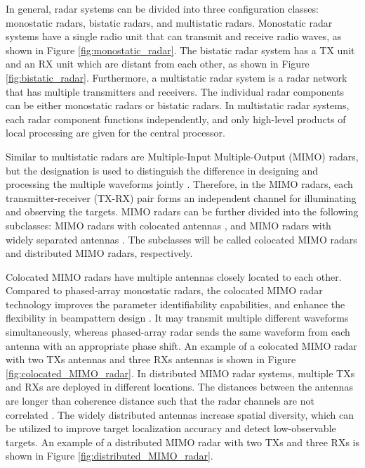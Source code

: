 \documentclass[english, 12pt, a4paper, elec, utf8, a-1b, online]{aaltothesis}
\numberwithin{equation}{section}
\begin{document}
In general, radar systems can be divided into three configuration classes: monostatic radars, bistatic radars, and multistatic radars.
Monostatic radar systems have a single radio unit that can transmit and receive radio waves, as shown in Figure \ref{fig:monostatic_radar}.
The bistatic radar system has a TX unit and an RX unit which are distant from each other, as shown in Figure \ref{fig:bistatic_radar}.
Furthermore, a multistatic radar system is a radar network that has multiple transmitters and receivers.
The individual radar components can be either monostatic radars or bistatic radars.
In multistatic radar systems, each radar component functions independently, and only high-level products of local processing are given for the central processor.

Similar to multistatic radars are Multiple-Input Multiple-Output (MIMO) radars, but the designation is used to distinguish the difference in designing and processing the multiple waveforms jointly \cite{Haimovich2008}.
Therefore, in the MIMO radars, each transmitter-receiver (TX-RX) pair forms an independent channel for illuminating and observing the targets.
MIMO radars can be further divided into the following subclasses: MIMO radars with colocated antennas \cite{Li2007}, and MIMO radars with widely separated antennas \cite{Haimovich2008}.
The subclasses will be called colocated MIMO radars and distributed MIMO radars, respectively.

Colocated MIMO radars have multiple antennas closely located to each other.
Compared to phased-array monostatic radars, the colocated MIMO radar technology improves the parameter identifiability capabilities, and enhance the flexibility in beampattern design \cite{Li2007}.
It may transmit multiple different waveforms simultaneously, whereas phased-array radar sends the same waveform from each antenna with an appropriate phase shift.
An example of a colocated MIMO radar with two TXs antennas and three RXs antennas is shown in Figure \ref{fig:colocated_MIMO_radar}.
In distributed MIMO radar systems, multiple TXs and RXs are deployed in different locations.
The distances between the antennas are longer than coherence distance such that the radar channels are not correlated \cite{Haimovich2008}.
The widely distributed antennas increase spatial diversity, which can be utilized to improve target localization accuracy and detect low-observable targets.
An example of a distributed MIMO radar with two TXs and three RXs is shown in Figure \ref{fig:distributed_MIMO_radar}.
\end{document}
